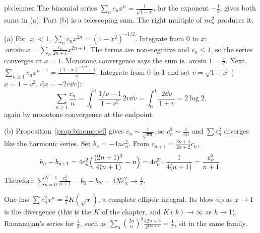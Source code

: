 \begin{solution}{pb:lehmer}
\idea The binomial series $\sum_nc_nx^n=\frac1{\sqrt{1-x}}$, for the exponent $-\frac12$, gives both sums in (a). Part (b) is a telescoping
sum. The right multiple of $nc_n^2$ produces it.

\writeup (a) For $|x|<1$, $\sum_nc_nx^{2n}=(1-x^2)^{-1/2}$. Integrate from $0$ to $x$: $\arcsin x=\sum_n\frac{c_n}{2n+1}x^{2n+1}$. The terms are
non-negative and $c_n\le1$, so the series converges at $x=1$. Monotone convergence says the sum is $\arcsin1=\frac\pi2$. Next,
$\sum_{n\ge1}c_nx^{n-1}=\frac{(1-x)^{-1/2}-1}x$. Integrate from $0$ to $1$ and set $v=\sqrt{1-x}$ ($x=1-v^2$, $\mathrm dx=-2v\dd v$):
\[
\sum_{n\ge1}\frac{c_n}n=\int_0^1\frac{1/v-1}{1-v^2}\,2v\dd v=\int_0^1\frac{2\dd v}{1+v}=2\log2,
\]
again by monotone convergence at the endpoint.

(b) Proposition~\ref{prop:binomcoef} gives $c_n\sim\frac1{\sqrt{\pi n}}$, so $c_n^2\sim\frac1{\pi n}$ and $\sum c_n^2$ diverges like the harmonic series. Set $b_n=-4nc_n^2$. From
$c_{n+1}=\frac{2n+1}{2n+2}c_n$,
\[
b_n-b_{n+1}=4c_n^2\Bigl(\frac{(2n+1)^2}{4(n+1)}-n\Bigr)=4c_n^2\cdot\frac1{4(n+1)}=\frac{c_n^2}{n+1}.
\]
Therefore $\sum_{n=0}^{N-1}\frac{c_n^2}{n+1}=b_0-b_N=4Nc_N^2\to\frac4\pi$.

\leads One has $\sum c_n^2x^n=\frac2\pi K(\sqrt x)$, a complete elliptic integral. Its blow-up as $x\to1$ is the divergence (this is the $K$ of the chapter, and $K(k)\to\infty$ as $k\to1$). Ramanujan's series for $\frac1\pi$, such as $\sum_n\binom{2n}n^3\frac{42n+5}{2^{12n+4}}=\frac1\pi$, sit in the same family.
\end{solution}

